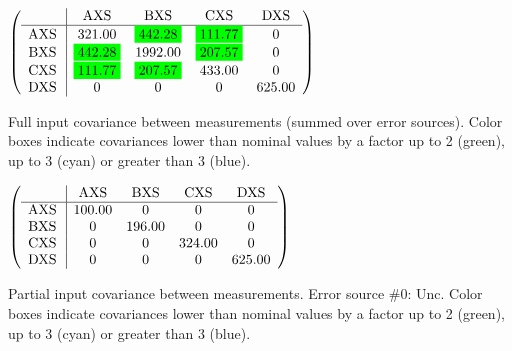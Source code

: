 \begin{table}[H]
\scriptsize
\begin{center}
\renewcommand{\arraystretch}{1.1}
\begin{math}\left(\begin{array}{c|cccc}
 & \mathrm{AXS} & 
\mathrm{BXS} & 
\mathrm{CXS} & 
\mathrm{DXS} \\
\hline
\mathrm{AXS} \hspace*{2pt} &     321.00 &  \colorbox{Green1}{$    442.28$} &  \colorbox{Green1}{$    111.77$} &  0 \\
\mathrm{BXS} \hspace*{2pt} &  \colorbox{Green1}{$    442.28$} &    1992.00 &  \colorbox{Green1}{$    207.57$} &  0 \\
\mathrm{CXS} \hspace*{2pt} &  \colorbox{Green1}{$    111.77$} &  \colorbox{Green1}{$    207.57$} &     433.00 &  0 \\
\mathrm{DXS} \hspace*{2pt} &  0 &  0 &  0 &     625.00 \\
\end{array}\right)\end{math}
\caption{Full input covariance between measurements (summed over error sources). Color boxes indicate covariances lower than nominal values by a factor up to 2 (green), up to 3 (cyan) or greater than 3 (blue).}
\renewcommand{\arraystretch}{1}
\end{center}
\end{table}
\begin{table}[H]
\scriptsize
\begin{center}
\renewcommand{\arraystretch}{1.1}
\begin{math}\left(\begin{array}{c|cccc}
 & \mathrm{AXS} & 
\mathrm{BXS} & 
\mathrm{CXS} & 
\mathrm{DXS} \\
\hline
\mathrm{AXS} \hspace*{2pt} &     100.00 &  0 &  0 &  0 \\
\mathrm{BXS} \hspace*{2pt} &  0 &     196.00 &  0 &  0 \\
\mathrm{CXS} \hspace*{2pt} &  0 &  0 &     324.00 &  0 \\
\mathrm{DXS} \hspace*{2pt} &  0 &  0 &  0 &     625.00 \\
\end{array}\right)\end{math}
\caption{Partial input covariance between measurements. Error source \#0: Unc. Color boxes indicate covariances lower than nominal values by a factor up to 2 (green), up to 3 (cyan) or greater than 3 (blue).}
\renewcommand{\arraystretch}{1}
\end{center}
\end{table}
